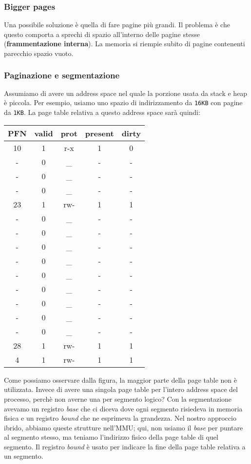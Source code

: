 \documentclass[12pt, letterpaper]{article}
\begin{document}
			\subsubsection{Bigger pages}
				Una possibile soluzione è quella di fare pagine più grandi. Il problema è che questo comporta a sprechi di spazio all'interno delle pagine stesse (\textbf{frammentazione interna}). La memoria si riempie subito di pagine contenenti parecchio spazio vuoto.
			
			\subsubsection{Paginazione e segmentazione}
				Assumiamo di avere un address space nel quale la porzione usata da stack e heap è piccola. Per esempio, usiamo uno spazio di indirizzamento da \texttt{16KB} con pagine da \texttt{1KB}. La page table relativa a questo address space sarà quindi:
				\begin{center} \begin{tabular}{|c|c|c|c|c|}
					\hline					
					PFN & valid & prot & present & dirty\\
					\hline
					10 & 1 & r-x & 1 & 0\\
					- & 0 & \_ & - & - \\
					- & 0 & \_ & - & - \\
					- & 0 & \_ & - & - \\
					23 & 1 & rw- & 1 & 1\\
					- & 0 & \_ & - & - \\
					- & 0 & \_ & - & - \\
					- & 0 & \_ & - & - \\
					- & 0 & \_ & - & - \\
					- & 0 & \_ & - & - \\
					- & 0 & \_ & - & - \\
					- & 0 & \_ & - & - \\
					- & 0 & \_ & - & - \\
					- & 0 & \_ & - & - \\
					28 & 1 & rw- & 1 & 1\\
					4 & 1 & rw- & 1 & 1\\
					\hline
				\end{tabular} \end{center}
				Come possiamo osservare dalla figura, la maggior parte della page table non è utilizzata.
				Invece di avere una singola page table per l'intero address space del processo, perchè non averne una per segmento logico? Con la segmentazione avevamo un registro \textit{base} che ci diceva dove ogni segmento risiedeva in memoria fisica e un registro \textit{bound} che ne esprimeva la grandezza. Nel nostro approccio ibrido, abbiamo queste strutture nell'MMU; qui, non usiamo il \textit{base} per puntare al segmento stesso, ma teniamo l'indirizzo fisico della page table di quel segmento. Il registro \textit{bound} è usato per indicare la fine della page table relativa a un segmento.\\
\end{document}
